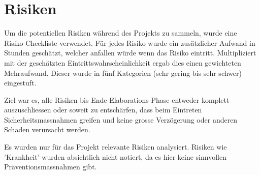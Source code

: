 \section{Risiken}\label{sec:risiken}

Um die potentiellen Risiken während des Projekts zu sammeln, wurde eine Risiko-Checkliste verwendet. Für jedes Risiko wurde ein zusätzlicher Aufwand in Stunden geschätzt, welcher anfallen würde wenn das Risiko eintritt. Multipliziert mit der geschätzten Eintrittswahrscheinlichkeit ergab dies einen gewichteten Mehraufwand. Dieser wurde in fünf Kategorien (sehr gering bis sehr schwer) eingestuft.

Ziel war es, alle Risiken bis Ende Elaborations-Phase entweder komplett auszuschliessen oder soweit zu entschärfen, dass beim Eintreten Sicherheitsmassnahmen greifen und keine grosse Verzögerung oder anderen Schaden verursacht werden.

Es wurden nur für das Projekt relevante Risiken analysiert. Risiken wie 'Krankheit' wurden absichtlich nicht notiert, da es hier keine sinnvollen Präventionsmassnahmen gibt.



